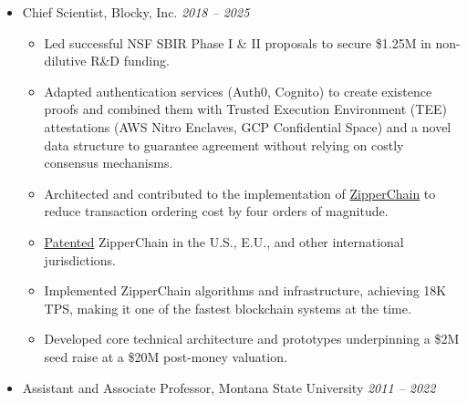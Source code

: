 \begin{itemize}
\begin{itemize}
        \item Raised \$500K+ in convertible financing to extend runway and
        deploy a paid beta in production.
    \end{itemize}


    \item Chief Scientist, Blocky, Inc.
    \hfill {\it 2018 -- 2025}

    \begin{itemize}
        \item Led successful NSF SBIR Phase I \& II proposals to secure \$1.25M
        in non-dilutive R\&D funding.

        \item Adapted authentication services (Auth0, Cognito) to create
        existence proofs and combined them with Trusted Execution Environment
        (TEE) attestations (AWS Nitro Enclaves, GCP Confidential Space) and a
        novel data structure to guarantee agreement without relying on costly
        consensus mechanisms.

        \item Architected and contributed to the implementation of
        \href{https://blocky.rocks/whitepaper}{ZipperChain} to reduce
        transaction ordering cost by four orders of magnitude.

        \item
        \href{https://patents.google.com/patent/US20230179435A1/}{Patented}
        ZipperChain in the U.S., E.U., and other international jurisdictions.

        \item Implemented ZipperChain algorithms and infrastructure, achieving
        18K TPS, making it one of the fastest blockchain systems at the time.

        \item Developed core technical architecture and prototypes underpinning
        a \$2M seed raise at a \$20M post-money valuation.
    \end{itemize}

    \item  Assistant and Associate Professor, Montana State University
    \hfill {\it 2011 -- 2022}


\end{itemize}
